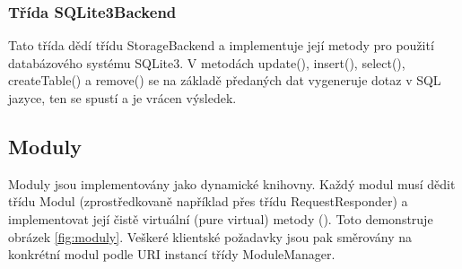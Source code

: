 \subsubsection{Třída SQLite3Backend}

Tato třída dědí třídu StorageBackend a implementuje její metody pro použití databázového systému SQLite3. V metodách
update(), insert(), select(), createTable() a remove() se na základě předaných
dat vygeneruje dotaz v SQL jazyce, ten se spustí
a je vrácen výsledek.

\subsection{Moduly}
\label{implementace_moduly}

Moduly jsou implementovány jako dynamické knihovny. Každý modul musí dědit třídu Modul (zprostředkovaně například přes třídu RequestResponder)
a implementovat její čistě virtuální
(pure virtual) metody (\cite{oop}). Toto demonstruje obrázek \ref{fig:moduly}. %
Veškeré klientské požadavky jsou pak směrovány na konkrétní modul podle URI instancí třídy ModuleManager.


